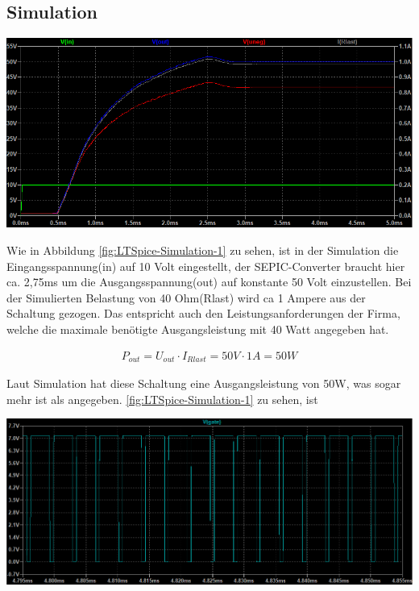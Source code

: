 \documentclass[paper=a4, 12pt]{scrreprt}
\begin{document}
		\subsection{Simulation}
			\begin{adjustbox}{center,caption={Simulation der Schaltung Mittels LTSpice},label={fig:LTSpice-Simulation-1},nofloat=figure,vspace=\bigskipamount}
				\includegraphics[width=\textwidth]{img/LTSpice_Simulation_1.PNG}
			\end{adjustbox}
			Wie in Abbildung \ref{fig:LTSpice-Simulation-1} zu sehen, ist in der Simulation die Eingangsspannung(in) auf 10 Volt eingestellt, der SEPIC-Converter braucht hier ca. 2,75ms um die Ausgangsspannung(out) auf konstante 50 Volt einzustellen. Bei der Simulierten Belastung von 40 Ohm(Rlast) wird ca 1 Ampere aus der Schaltung gezogen. Das entspricht auch den Leistungsanforderungen der Firma, welche die maximale benötigte Ausgangsleistung mit 40 Watt angegeben hat. 
			
			\begin{align*} 
			P_{out} = U_{out} \cdot I_{Rlast} = 50V \cdot 1A = 50W
			\end{align*} 
			
			Laut Simulation hat diese Schaltung eine Ausgangsleistung von 50W, was sogar mehr ist als angegeben. 
			\ref{fig:LTSpice-Simulation-1} zu sehen, ist
			\begin{adjustbox}{center,caption={Simulation der Schaltung Mittels LTSpice},label={fig:LTSpice-Simulation-2},nofloat=figure,vspace=\bigskipamount}
				\includegraphics[width=\textwidth]{img/LTSpice_Simulation_2.PNG}
			\end{adjustbox}
			
\end{document}
